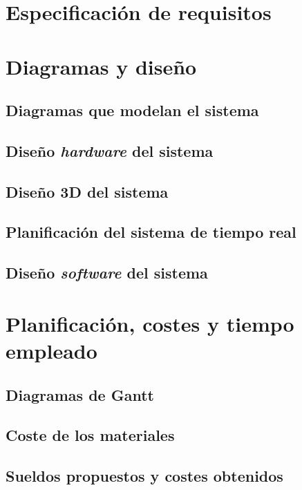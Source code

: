 \chapter{Especificación de requisitos}\label{chap:requirements}


\chapter{Diagramas y diseño}\label{chap:design}

\section{Diagramas que modelan el sistema}\label{sec:sys-diagrams}

\section{Diseño \textit{hardware} del sistema}\label{sec:hardware-design}
\section{Diseño 3D del sistema}\label{sec:3d-design}
\section{Planificación del sistema de tiempo real}\label{sec:rt-design}

\section{Diseño \textit{software} del sistema}\label{sec:software-design}

\chapter{Planificación, costes y tiempo empleado}\label{chap:planification}
\section{Diagramas de Gantt}
\section{Coste de los materiales}
\section{Sueldos propuestos y costes obtenidos}
